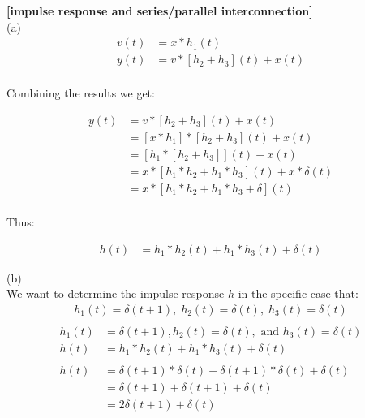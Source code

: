 \documentclass{article}
\begin{document}
 {\bf [impulse response and series/parallel interconnection]}\\
(a)\\
\begin{equation*}
\begin{split}
    v(t) &= x * h_1(t)\\
    y(t) &= v * [h_2 + h_3](t) + x(t)\\
\end{split}
\end{equation*}

Combining the results we get:

\begin{equation*}
\begin{split}
    y(t) &= v * [h_2 + h_3](t) + x(t)\\
    &= [x * h_1] * [h_2 + h_3](t) + x(t)\\
    &= [h_1 * [h_2 + h_3]](t) + x(t)\\
    &= x * [h_1 * h_2 + h_1 * h_3](t) + x * \delta(t)\\
    &= x * [h_1 * h_2 + h_1 * h_3 + \delta](t)\\
\end{split}
\end{equation*}

Thus:

\begin{equation*}
\begin{split}
    h(t) &= h_1 * h_2(t) + h_1 * h_3(t) + \delta(t)
\end{split}
\end{equation*}

(b)\\
We want to determine the impulse response $h$ in the specific case that:
\begin{equation*}
\begin{split}
    h_1(t) = \delta(t + 1), \; h_2(t) = \delta(t), \; h_3(t) = \delta(t)\\
\end{split}
\end{equation*}
\begin{equation*}
\begin{split}
    h_1(t)& = \delta(t + 1), h_2(t) = \delta(t), \text{ and } h_3(t) = \delta(t)\\
    h(t) &= h_1 * h_2(t) + h_1 * h_3(t) + \delta(t)\\\\
    h(t) &= \delta(t + 1) * \delta(t) + \delta(t + 1) * \delta(t) + \delta(t)\\
    &= \delta(t + 1) + \delta(t + 1) + \delta(t)\\
    &= 2 \delta(t + 1) + \delta(t)\\
\end{split}
\end{equation*}
\end{document}
